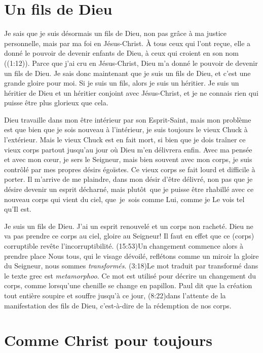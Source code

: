 \section{Un fils de Dieu}

Je sais que je suis désormais un fils de Dieu,
 non pas grâce à ma justice personnelle,
 mais par ma foi en Jésus-Christ.
 \Og À tous ceux qui l'ont reçue, elle a donné le pouvoir
 de devenir enfants de Dieu,
 à ceux qui croient en son nom \Fg{} ((1:12)).
 Parce que j'ai cru en Jésus-Christ, Dieu m'a donné le pouvoir
 de devenir un fils de Dieu.
 Je sais donc maintenant que je suis un fils de Dieu,
 et c'est une grande gloire pour moi.
 Si je suis un fils, alors je suis un héritier.
 Je suis un héritier de Dieu et un héritier conjoint avec Jésus-Christ,
 et je ne connais rien qui puisse être plus glorieux que cela.

Dieu travaille dans mon être intérieur par son Esprit-Saint,
 mais mon problème est que bien que je sois nouveau à l'intérieur,
 je suis toujours le vieux Chuck à l'extérieur.
 Mais le vieux Chuck est en fait mort, si bien que je dois traîner
 ce vieux corps partout jusqu'au jour où Dieu m'en délivrera enfin.
 Avec ma pensée et avec mon cœur, je sers le Seigneur,
 mais bien souvent avec mon corps,
 je suis contrôlé par mes propres désirs égoïstes.
 Ce vieux corps se fait lourd et difficile à porter.
 Il m'arrive de me plaindre, dans mon désir d'être délivré,
 non pas que je désire devenir un esprit décharné,
 mais plutôt~que je puisse
 être rhabillé avec ce nouveau corps qui vient du ciel,
 que~je~sois comme Lui, comme je Le vois tel qu'Il est.

Je suis un fils de Dieu. J'ai un esprit renouvelé et un corps non racheté.
 Dieu ne va pas prendre ce corps au ciel, gloire au Seigneur!
 \Og Il faut en effet que ce (corps) corruptible
 revête l'incorruptibilité. \Fg{}
 (15:53)Un changement
 commence alors à prendre place\frcolon{}
 \Og Nous tous, qui le visage dévoilé,
 reflétons comme un miroir la gloire du Seigneur,
 nous sommes \emph{transformés}. \Fg{}
 (3:18)Le mot traduit
 par \Og transformé \Fg{}
 dans le texte grec est \emph{metamorphoo}.
 Ce mot est utilisé pour décrire un changement du corps,
 comme lorsqu'une chenille se change en papillon.
 Paul dit que la création tout entière soupire et souffre
 jusqu'à ce jour, (8:22)dans l'attente
 de la manifestation des fils de Dieu,
 c'est-à-dire de la rédemption de nos corps.


\section{Comme Christ pour toujours}

